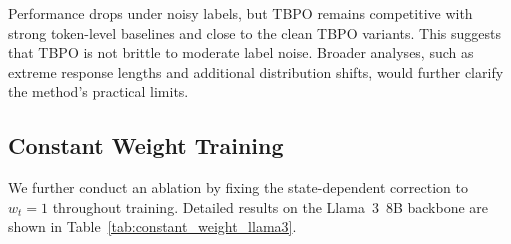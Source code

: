 \documentclass{article}
\theoremstyle{plain}
\theoremstyle{definition}
\theoremstyle{remark}
\begin{document}
\begin{table}[t]
\centering
\small
\setlength{\tabcolsep}{7pt}
\renewcommand{\arraystretch}{1.15}
\caption{General capability results on the Llama~3~8B backbone when TBPO is trained with 10\% noisy preference data, created by swapping the chosen and rejected responses in randomly selected training pairs.}
\label{tab:noisy_training_llama3}
\end{table}

Performance drops under noisy labels, but TBPO remains competitive with strong token-level baselines and close to the clean TBPO variants. This suggests that TBPO is not brittle to moderate label noise. Broader analyses, such as extreme response lengths and additional distribution shifts, would further clarify the method's practical limits.

\subsection{Constant Weight Training}

We further conduct an ablation by fixing the state-dependent correction to $w_t=1$ throughout training. Detailed results on the Llama~3~8B backbone are shown in Table~\ref{tab:constant_weight_llama3}.
\end{document}
